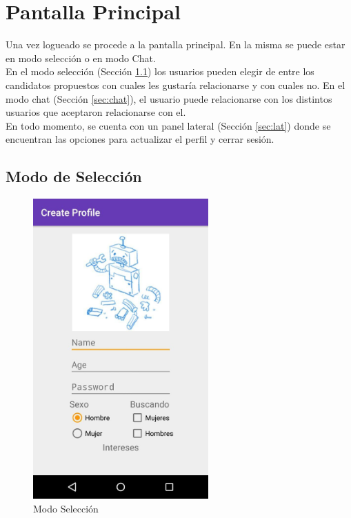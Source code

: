 \documentclass[10pt,letterpaper,extrafontsizes]{memoir}
\begin{document}
\chapter{Pantalla Principal}

Una vez logueado se procede a la pantalla principal. En la misma se puede estar en modo selección o en modo Chat.\\
En el modo selección (Sección \ref{sec:selección}) los usuarios pueden elegir de entre los candidatos propuestos con cuales les gustaría relacionarse y con cuales no. En el modo chat (Sección \ref{sec:chat}), el usuario puede relacionarse con los distintos usuarios que aceptaron relacionarse con el.\\
En todo momento, se cuenta con un panel lateral (Sección \ref{sec:lat}) donde se encuentran las opciones para actualizar el perfil y cerrar sesión.

\newpage
\section{Modo de Selección} \label{sec:selección}

\begin{figure}[H]
    \centering
\includegraphics[width=0.6\textwidth]{graficos/capturas/i}
    \caption{Modo Selección}
    \label{fig:pselec}
\end{figure}
\end{document}

